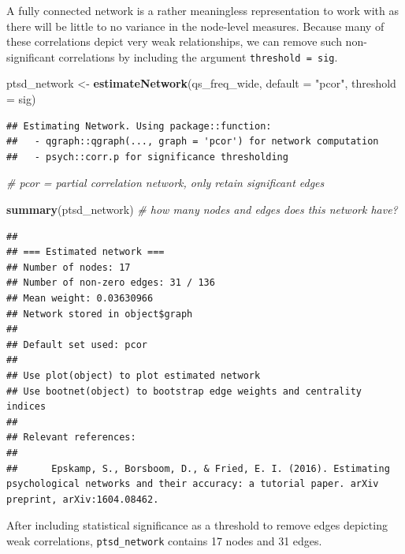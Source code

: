 \documentclass[
]{book}
\newenvironment{Shaded}{\begin{snugshade}}{\end{snugshade}}
\newcommand{\AttributeTok}[1]{\textcolor[rgb]{0.13,0.29,0.53}{#1}}
\newcommand{\CommentTok}[1]{\textcolor[rgb]{0.56,0.35,0.01}{\textit{#1}}}
\newcommand{\FunctionTok}[1]{\textcolor[rgb]{0.13,0.29,0.53}{\textbf{#1}}}
\newcommand{\NormalTok}[1]{#1}
\newcommand{\OtherTok}[1]{\textcolor[rgb]{0.56,0.35,0.01}{#1}}
\newcommand{\StringTok}[1]{\textcolor[rgb]{0.31,0.60,0.02}{#1}}
\begin{document}
A fully connected network is a rather meaningless representation to work with as there will be little to no variance in the node-level measures. Because many of these correlations depict very weak relationships, we can remove such non-significant correlations by including the argument \texttt{threshold\ =\ \textquotesingle{}sig\textquotesingle{}}.

\begin{Shaded}
\begin{Highlighting}[]
\NormalTok{ptsd\_network }\OtherTok{\textless{}{-}} \FunctionTok{estimateNetwork}\NormalTok{(qs\_freq\_wide, }\AttributeTok{default =} \StringTok{"pcor"}\NormalTok{, }
                                \AttributeTok{threshold =} \StringTok{\textquotesingle{}sig\textquotesingle{}}\NormalTok{) }
\end{Highlighting}
\end{Shaded}

\begin{verbatim}
## Estimating Network. Using package::function:
##   - qgraph::qgraph(..., graph = 'pcor') for network computation
##   - psych::corr.p for significance thresholding
\end{verbatim}

\begin{Shaded}
\begin{Highlighting}[]
\CommentTok{\# pcor = partial correlation network, only retain significant edges }

\FunctionTok{summary}\NormalTok{(ptsd\_network) }\CommentTok{\# how many nodes and edges does this network have?}
\end{Highlighting}
\end{Shaded}

\begin{verbatim}
## 
## === Estimated network ===
## Number of nodes: 17 
## Number of non-zero edges: 31 / 136 
## Mean weight: 0.03630966 
## Network stored in object$graph 
##  
## Default set used: pcor 
##  
## Use plot(object) to plot estimated network 
## Use bootnet(object) to bootstrap edge weights and centrality indices 
## 
## Relevant references:
## 
##      Epskamp, S., Borsboom, D., & Fried, E. I. (2016). Estimating psychological networks and their accuracy: a tutorial paper. arXiv preprint, arXiv:1604.08462.
\end{verbatim}

After including statistical significance as a threshold to remove edges depicting weak correlations, \texttt{ptsd\_network} contains 17 nodes and 31 edges.
\end{document}
